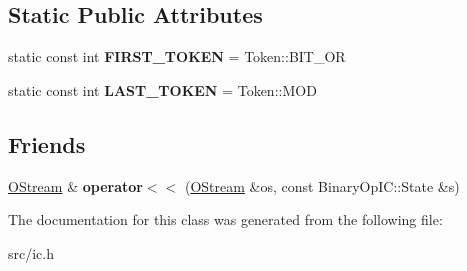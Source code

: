 \subsection*{Static Public Attributes}
\begin{DoxyCompactItemize}
\item 
\hypertarget{classv8_1_1internal_1_1_binary_op_i_c_1_1_b_a_s_e___e_m_b_e_d_d_e_d_a7dfcc487faf7e59e21df07fe2307d61b}{}static const int {\bfseries F\+I\+R\+S\+T\+\_\+\+T\+O\+K\+E\+N} = Token\+::\+B\+I\+T\+\_\+\+O\+R\label{classv8_1_1internal_1_1_binary_op_i_c_1_1_b_a_s_e___e_m_b_e_d_d_e_d_a7dfcc487faf7e59e21df07fe2307d61b}

\item 
\hypertarget{classv8_1_1internal_1_1_binary_op_i_c_1_1_b_a_s_e___e_m_b_e_d_d_e_d_af62bb11c9b6e2a5283f68b660b18616a}{}static const int {\bfseries L\+A\+S\+T\+\_\+\+T\+O\+K\+E\+N} = Token\+::\+M\+O\+D\label{classv8_1_1internal_1_1_binary_op_i_c_1_1_b_a_s_e___e_m_b_e_d_d_e_d_af62bb11c9b6e2a5283f68b660b18616a}

\end{DoxyCompactItemize}
\subsection*{Friends}
\begin{DoxyCompactItemize}
\item 
\hypertarget{classv8_1_1internal_1_1_binary_op_i_c_1_1_b_a_s_e___e_m_b_e_d_d_e_d_a1ae2345d024853c247c62e6057fbc12e}{}\hyperlink{classv8_1_1internal_1_1_o_stream}{O\+Stream} \& {\bfseries operator$<$$<$} (\hyperlink{classv8_1_1internal_1_1_o_stream}{O\+Stream} \&os, const Binary\+Op\+I\+C\+::\+State \&s)\label{classv8_1_1internal_1_1_binary_op_i_c_1_1_b_a_s_e___e_m_b_e_d_d_e_d_a1ae2345d024853c247c62e6057fbc12e}

\end{DoxyCompactItemize}


The documentation for this class was generated from the following file\+:\begin{DoxyCompactItemize}
\item 
src/ic.\+h\end{DoxyCompactItemize}
